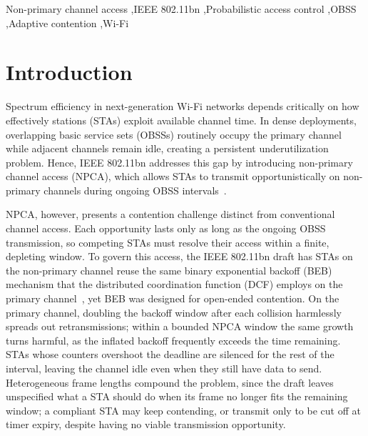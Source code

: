 \documentclass[a4paper,fleqn]{cas-dc}
\begin{document}
\begin{keywords}
Non-primary channel access \sep IEEE 802.11bn \sep Probabilistic access control \sep OBSS \sep Adaptive contention \sep Wi-Fi
\end{keywords}

\maketitle

\section{Introduction}
\label{sec:introduction}

Spectrum efficiency in next-generation Wi-Fi networks depends critically on how effectively stations (STAs) exploit available channel time. In dense deployments, overlapping basic service sets (OBSSs) routinely occupy the primary channel while adjacent channels remain idle, creating a persistent underutilization problem. Hence, IEEE 802.11bn addresses this gap by introducing non-primary channel access (NPCA), which allows STAs to transmit opportunistically on non-primary channels during ongoing OBSS intervals~\citep{ieee80211bn,wei2024non}.

NPCA, however, presents a contention challenge distinct from conventional channel access. Each opportunity lasts only as long as the ongoing OBSS transmission, so competing STAs must resolve their access within a finite, depleting window. To govern this access, the IEEE 802.11bn draft has STAs on the non-primary channel reuse the same binary exponential backoff (BEB) mechanism that the distributed coordination function (DCF) employs on the primary channel~\citep{ieee80211bn}, yet BEB was designed for open-ended contention. On the primary channel, doubling the backoff window after each collision harmlessly spreads out retransmissions; within a bounded NPCA window the same growth turns harmful, as the inflated backoff frequently exceeds the time remaining. STAs whose counters overshoot the deadline are silenced for the rest of the interval, leaving the channel idle even when they still have data to send. Heterogeneous frame lengths compound the problem, since the draft leaves unspecified what a STA should do when its frame no longer fits the remaining window; a compliant STA may keep contending, or transmit only to be cut off at timer expiry, despite having no viable transmission opportunity.

\end{document}
